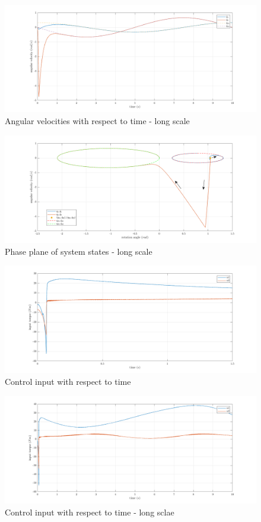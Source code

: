 \documentclass[a4paper]{article}
\begin{document}
\begin{figure}[H]
    \centering
    \includegraphics[width=15cm]{fig/sim2/qdotlong.png}
    \caption{Angular velocities with respect to time - long scale}
\end{figure}
\begin{figure}[H]
    \centering
    \includegraphics[width=15cm]{fig/sim2/phaseplanelong.png}
    \caption{Phase plane of system states - long scale}
\end{figure}
\begin{figure}[H]
    \centering
    \includegraphics[width=15cm]{fig/sim2/u.png}
    \caption{Control input with respect to time}
\end{figure}
\begin{figure}[H]
    \centering
    \includegraphics[width=15cm]{fig/sim2/ulong.png}
    \caption{Control input with respect to time - long sclae}
\end{figure}
\end{document}
